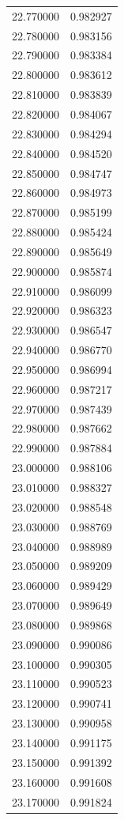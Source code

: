 \begin{tabular}{rr}
22.770000 & 0.982927 \\
22.780000 & 0.983156 \\
22.790000 & 0.983384 \\
22.800000 & 0.983612 \\
22.810000 & 0.983839 \\
22.820000 & 0.984067 \\
22.830000 & 0.984294 \\
22.840000 & 0.984520 \\
22.850000 & 0.984747 \\
22.860000 & 0.984973 \\
22.870000 & 0.985199 \\
22.880000 & 0.985424 \\
22.890000 & 0.985649 \\
22.900000 & 0.985874 \\
22.910000 & 0.986099 \\
22.920000 & 0.986323 \\
22.930000 & 0.986547 \\
22.940000 & 0.986770 \\
22.950000 & 0.986994 \\
22.960000 & 0.987217 \\
22.970000 & 0.987439 \\
22.980000 & 0.987662 \\
22.990000 & 0.987884 \\
23.000000 & 0.988106 \\
23.010000 & 0.988327 \\
23.020000 & 0.988548 \\
23.030000 & 0.988769 \\
23.040000 & 0.988989 \\
23.050000 & 0.989209 \\
23.060000 & 0.989429 \\
23.070000 & 0.989649 \\
23.080000 & 0.989868 \\
23.090000 & 0.990086 \\
23.100000 & 0.990305 \\
23.110000 & 0.990523 \\
23.120000 & 0.990741 \\
23.130000 & 0.990958 \\
23.140000 & 0.991175 \\
23.150000 & 0.991392 \\
23.160000 & 0.991608 \\
23.170000 & 0.991824 \\

\end{tabular}
